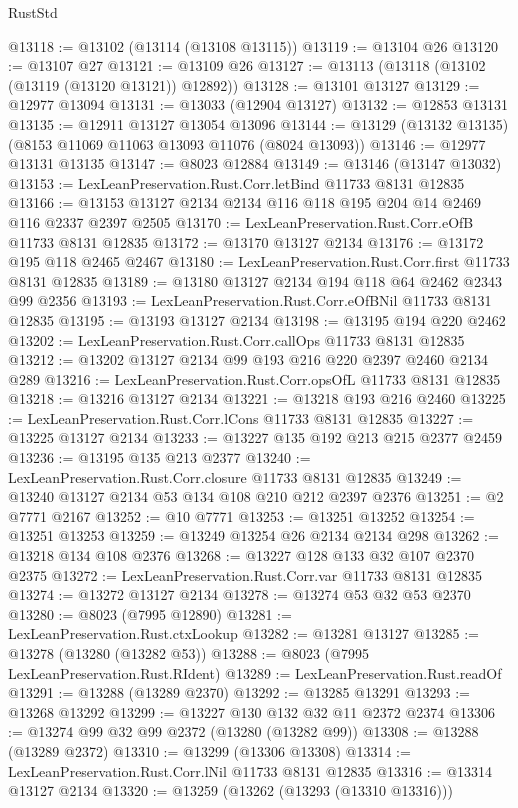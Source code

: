 \begin{lexlean}{RustStd}
\begin{coremodule}
@13118 := @13102 (@13114 (@13108 @13115))
@13119 := @13104 @26
@13120 := @13107 @27
@13121 := @13109 @26
@13127 := @13113 (@13118 (@13102 (@13119 (@13120 @13121)) @12892))
@13128 := @13101 @13127
@13129 := @12977 @13094
@13131 := @13033 (@12904 @13127)
@13132 := @12853 @13131
@13135 := @12911 @13127 @13054 @13096
@13144 := @13129 (@13132 @13135) (@8153 @11069 @11063 @13093 @11076 (@8024 @13093))
@13146 := @12977 @13131 @13135
@13147 := @8023 @12884
@13149 := @13146 (@13147 @13032)
@13153 := LexLeanPreservation.Rust.Corr.letBind @11733 @8131 @12835
@13166 := @13153 @13127 @2134 @2134 @116 @118 @195 @204 @14 @2469 @116 @2337 @2397 @2505
@13170 := LexLeanPreservation.Rust.Corr.eOfB @11733 @8131 @12835
@13172 := @13170 @13127 @2134
@13176 := @13172 @195 @118 @2465 @2467
@13180 := LexLeanPreservation.Rust.Corr.first @11733 @8131 @12835
@13189 := @13180 @13127 @2134 @194 @118 @64 @2462 @2343 @99 @2356
@13193 := LexLeanPreservation.Rust.Corr.eOfBNil @11733 @8131 @12835
@13195 := @13193 @13127 @2134
@13198 := @13195 @194 @220 @2462
@13202 := LexLeanPreservation.Rust.Corr.callOps @11733 @8131 @12835
@13212 := @13202 @13127 @2134 @99 @193 @216 @220 @2397 @2460 @2134 @289
@13216 := LexLeanPreservation.Rust.Corr.opsOfL @11733 @8131 @12835
@13218 := @13216 @13127 @2134
@13221 := @13218 @193 @216 @2460
@13225 := LexLeanPreservation.Rust.Corr.lCons @11733 @8131 @12835
@13227 := @13225 @13127 @2134
@13233 := @13227 @135 @192 @213 @215 @2377 @2459
@13236 := @13195 @135 @213 @2377
@13240 := LexLeanPreservation.Rust.Corr.closure @11733 @8131 @12835
@13249 := @13240 @13127 @2134 @53 @134 @108 @210 @212 @2397 @2376
@13251 := @2 @7771 @2167
@13252 := @10 @7771
@13253 := @13251 @13252
@13254 := @13251 @13253
@13259 := @13249 @13254 @26 @2134 @2134 @298
@13262 := @13218 @134 @108 @2376
@13268 := @13227 @128 @133 @32 @107 @2370 @2375
@13272 := LexLeanPreservation.Rust.Corr.var @11733 @8131 @12835
@13274 := @13272 @13127 @2134
@13278 := @13274 @53 @32 @53 @2370
@13280 := @8023 (@7995 @12890)
@13281 := LexLeanPreservation.Rust.ctxLookup
@13282 := @13281 @13127
@13285 := @13278 (@13280 (@13282 @53))
@13288 := @8023 (@7995 LexLeanPreservation.Rust.RIdent)
@13289 := LexLeanPreservation.Rust.readOf
@13291 := @13288 (@13289 @2370)
@13292 := @13285 @13291
@13293 := @13268 @13292
@13299 := @13227 @130 @132 @32 @11 @2372 @2374
@13306 := @13274 @99 @32 @99 @2372 (@13280 (@13282 @99))
@13308 := @13288 (@13289 @2372)
@13310 := @13299 (@13306 @13308)
@13314 := LexLeanPreservation.Rust.Corr.lNil @11733 @8131 @12835
@13316 := @13314 @13127 @2134
@13320 := @13259 (@13262 (@13293 (@13310 @13316)))

\end{coremodule}
\end{lexlean}
